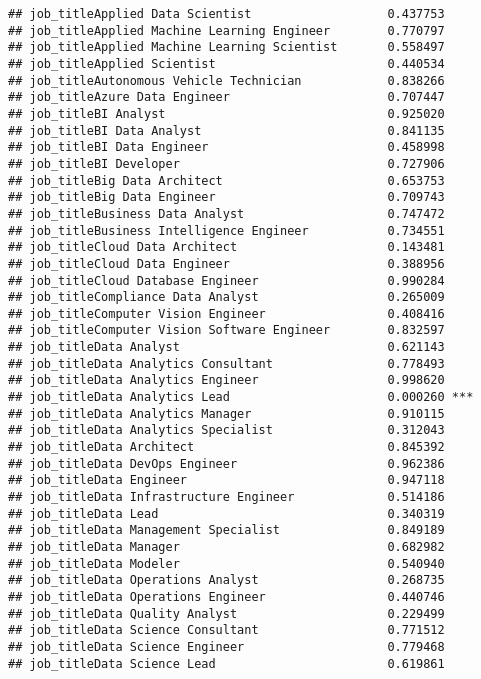 \documentclass[
]{article}
\begin{document}
\begin{verbatim}
## job_titleApplied Data Scientist                   0.437753    
## job_titleApplied Machine Learning Engineer        0.770797    
## job_titleApplied Machine Learning Scientist       0.558497    
## job_titleApplied Scientist                        0.440534    
## job_titleAutonomous Vehicle Technician            0.838266    
## job_titleAzure Data Engineer                      0.707447    
## job_titleBI Analyst                               0.925020    
## job_titleBI Data Analyst                          0.841135    
## job_titleBI Data Engineer                         0.458998    
## job_titleBI Developer                             0.727906    
## job_titleBig Data Architect                       0.653753    
## job_titleBig Data Engineer                        0.709743    
## job_titleBusiness Data Analyst                    0.747472    
## job_titleBusiness Intelligence Engineer           0.734551    
## job_titleCloud Data Architect                     0.143481    
## job_titleCloud Data Engineer                      0.388956    
## job_titleCloud Database Engineer                  0.990284    
## job_titleCompliance Data Analyst                  0.265009    
## job_titleComputer Vision Engineer                 0.408416    
## job_titleComputer Vision Software Engineer        0.832597    
## job_titleData Analyst                             0.621143    
## job_titleData Analytics Consultant                0.778493    
## job_titleData Analytics Engineer                  0.998620    
## job_titleData Analytics Lead                      0.000260 ***
## job_titleData Analytics Manager                   0.910115    
## job_titleData Analytics Specialist                0.312043    
## job_titleData Architect                           0.845392    
## job_titleData DevOps Engineer                     0.962386    
## job_titleData Engineer                            0.947118    
## job_titleData Infrastructure Engineer             0.514186    
## job_titleData Lead                                0.340319    
## job_titleData Management Specialist               0.849189    
## job_titleData Manager                             0.682982    
## job_titleData Modeler                             0.540940    
## job_titleData Operations Analyst                  0.268735    
## job_titleData Operations Engineer                 0.440746    
## job_titleData Quality Analyst                     0.229499    
## job_titleData Science Consultant                  0.771512    
## job_titleData Science Engineer                    0.779468    
## job_titleData Science Lead                        0.619861    

\end{verbatim}
\end{document}
